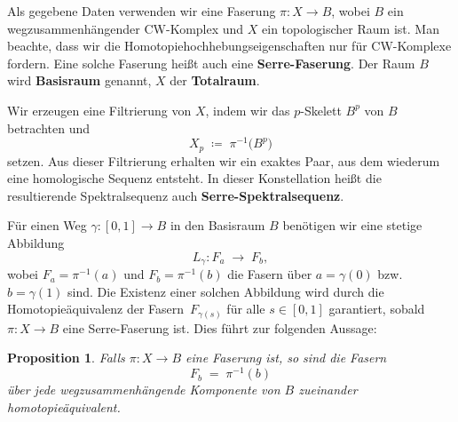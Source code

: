 \documentclass[12pt]{article}
\numberwithin{conj}{section}
\newtheorem{proposition}[conj]{Proposition}
\begin{document}
        Als gegebene Daten verwenden wir eine Faserung \(\pi : X \to B\), wobei \(B\) ein wegzusammenhängender CW-Komplex und \(X\) ein topologischer Raum ist. Man beachte, dass wir die Homotopiehochhebungseigenschaften nur für CW-Komplexe fordern. Eine solche Faserung heißt auch eine \textbf{Serre-Faserung}. Der Raum \(B\) wird \textbf{Basisraum} genannt, \(X\) der \textbf{Totalraum}. 
        
        Wir erzeugen eine Filtrierung von \(X\), indem wir das \(p\)-Skelett \(B^p\) von \(B\) betrachten und
        \[
            X_p \;\coloneqq\; \pi^{-1}\bigl(B^p\bigr)
        \]
        setzen. Aus dieser Filtrierung erhalten wir ein exaktes Paar, aus dem wiederum eine homologische Sequenz entsteht. In dieser Konstellation heißt die resultierende Spektralsequenz auch \textbf{Serre-Spektralsequenz}.
        
        \smallskip
        
        Für einen Weg \(\gamma: [0,1] \to B\) in den Basisraum \(B\) benötigen wir eine stetige Abbildung
        \[
            L_\gamma : F_a \;\longrightarrow\; F_b,
        \]
        wobei \(F_a = \pi^{-1}(a)\) und \(F_b = \pi^{-1}(b)\) die Fasern über \(a = \gamma(0)\) bzw.\ \(b = \gamma(1)\) sind. Die Existenz einer solchen Abbildung wird durch die Homotopieäquivalenz der Fasern \(\,F_{\gamma(s)}\) für alle \(s\in[0,1]\) garantiert, sobald \(\pi : X \to B\) eine Serre-Faserung ist. Dies führt zur folgenden Aussage:
        
        \begin{proposition}
            Falls \(\pi : X \to B\) eine Faserung ist, so sind die Fasern 
            \[
                F_b \;=\; \pi^{-1}(b)
            \]
            über jede wegzusammenhängende Komponente von \(B\) zueinander homotopieäquivalent.
        \end{proposition}
        
\end{document}
